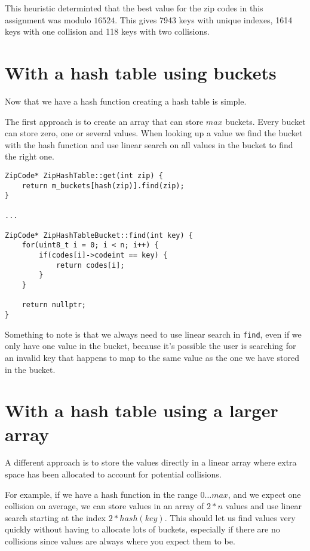 \documentclass[a4paper,11pt]{article}
\begin{document}
This heuristic determinted that the best value for the zip codes in this assignment was modulo $16524$.
This gives 7943 keys with unique indexes, 1614 keys with one collision and 118 keys with two collisions.

\section*{With a hash table using buckets}

Now that we have a hash function creating a hash table is simple.

The first approach is to create an array that can store $max$ buckets.
Every bucket can store zero, one or several values.
When looking up a value we find the bucket with the hash function and use linear search on all values in the bucket to find the right one.

\begin{verbatim}
ZipCode* ZipHashTable::get(int zip) {
	return m_buckets[hash(zip)].find(zip);
}

...

ZipCode* ZipHashTableBucket::find(int key) {
	for(uint8_t i = 0; i < n; i++) {
		if(codes[i]->codeint == key) {
			return codes[i];
		}
	}

	return nullptr;
}
\end{verbatim}

Something to note is that we always need to use linear search in \texttt{find},
even if we only have one value in the bucket, because it's possible the user is searching for an invalid key that happens to map to the same value as the one we have stored in the bucket.

\section*{With a hash table using a larger array}

A different approach is to store the values directly in a linear array where extra space has been allocated to account for potential collisions.

For example, if we have a hash function in the range $0 \dots max$, and we expect one collision on average, we can store values in an array of $2 * n$ values and use linear search starting at the index $2 * hash(key)$.
This should let us find values very quickly without having to allocate lots of buckets, especially if there are no collisions since values are always where you expect them to be.
\end{document}
